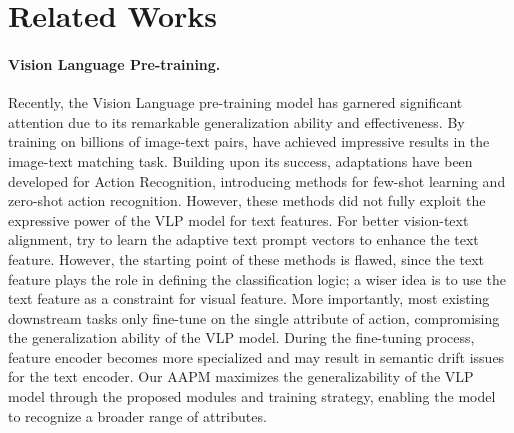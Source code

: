 \section{Related Works}
\label{related}


\paragraph{Vision Language Pre-training.}

Recently, the Vision Language pre-training model has garnered significant attention due to its remarkable generalization ability and effectiveness. By training on billions of image-text pairs, \cite{radford2021learning,jia2021scaling} have achieved impressive results in the image-text matching task. Building upon its success, adaptations \cite{ni2022expanding,wang2021actionclip,xu2021videoclip} have been developed for Action Recognition, introducing methods for few-shot learning and zero-shot action recognition. However, these methods did not fully exploit the expressive power of the VLP model for text features. For better vision-text alignment, \cite{zhou2022learning,zhou2022conditional} try to learn the adaptive text prompt vectors to enhance the text feature. However, the starting point of these methods is flawed, since the text feature plays the role in defining the classification logic; a wiser idea is to use the text feature as a constraint for visual feature. More importantly, most existing downstream tasks \cite{wei2023improving,shen2021much} only fine-tune on the single attribute of action, compromising the generalization ability of the VLP model. During the fine-tuning process, feature encoder becomes more specialized and may result in semantic drift issues \cite{wu2023revisiting} for the text encoder. Our AAPM maximizes the generalizability of the VLP model through the proposed modules and training strategy, enabling the model to recognize a broader range of attributes.


